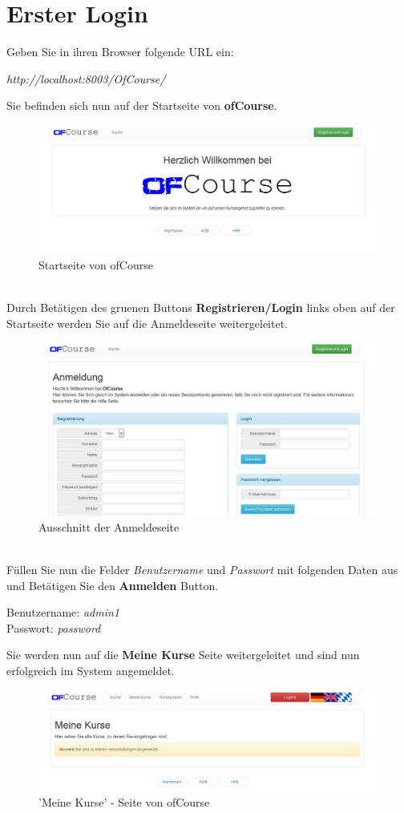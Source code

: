 \documentclass[a4paper, 12pt]{scrreprt}
\begin{document}
\chapter{Erster Login}
Geben Sie in ihren Browser folgende URL ein:
\begin{center}
	{\it http://localhost:8003/OfCourse/}
\end{center}
Sie befinden sich nun auf der Startseite von \textbf{ofCourse}.
\begin{figure}[h]
\centering
\includegraphics[width=0.8\linewidth]{Grafiken/indexPage}
\caption[]{Startseite von ofCourse}
\label{fig:indexPage}
\end{figure} \ \\
Durch Betätigen des  gruenen Buttons \textbf{Registrieren/Login} links oben auf der Startseite werden Sie auf die Anmeldeseite weitergeleitet.
\begin{figure}[h]
\centering
\includegraphics[width=0.8\linewidth]{Grafiken/loginPage}
\caption{Ausschnitt der Anmeldeseite}
\label{fig:loginPage}
\end{figure} \newpage
\ \\
Füllen Sie nun die Felder {\it Benutzername} und {\it Passwort} mit folgenden Daten aus und Betätigen Sie den \textbf{Anmelden} Button.
\begin{center}
	Benutzername: {\it admin1}\\
	Passwort: {\it password}
\end{center}
Sie werden nun auf die \textbf{Meine Kurse} Seite weitergeleitet und sind nun erfolgreich im System angemeldet.
\begin{figure}[h]
\centering
\includegraphics[width=0.8\linewidth]{Grafiken/myCoursesPage}
\caption{'Meine Kurse' - Seite von ofCourse}
\label{fig:myCoursesPage}
\end{figure}
\end{document}
